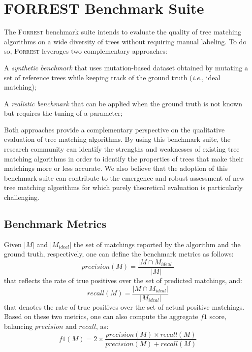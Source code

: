\documentclass{vldb}
\newcommand{\forrest}[0]{\textsc{Forrest}\xspace}
\begin{document}

\section{FORREST Benchmark Suite}\label{sec:forrest}
The \forrest benchmark suite intends to evaluate the quality of tree matching algorithms on a wide diversity of trees without requiring manual labeling.
To do so, \forrest leverages two complementary approaches:
\begin{compactenum}
    \item A \emph{synthetic benchmark} that uses mutation-based dataset obtained by mutating a set of reference trees while keeping track of the ground truth (\emph{i.e.}, ideal matching);
    \item A \emph{realistic benchmark} that can be applied when the ground truth is not known but requires the tuning of a parameter;
\end{compactenum}

Both approaches provide a complementary perspective on the qualitative evaluation of tree matching algorithms.
By using this benchmark suite, the research community can identify the strengths and weaknesses of existing tree matching algorithms in order to identify the properties of trees that make their matchings more or less accurate.
We also believe that the adoption of this benchmark suite can contribute to the emergence and robust assessment of new tree matching algorithms for which purely theoretical evaluation is particularly challenging.

\subsection{Benchmark Metrics}
Given $|M|$ and $|M_{ideal}|$ the set of matchings reported by the algorithm and the ground truth, respectively, one can define the benchmark metrics as follows:
\begin{equation}
    precision(M) = \frac{|M \cap M_{ideal}|}{|M|}
\end{equation}
that reflects the rate of true positives over the set of predicted matchings, and:
\begin{equation}
    recall(M) = \frac{|M \cap M_{ideal}|}{|M_{ideal}|}
\end{equation}
that denotes the rate of true positives over the set of actual positive matchings.
Based on these two metrics, one can also compute the aggregate $f1$ score, balancing $precision$ and $recall$, as:
\begin{equation}
    f1(M) =  2 \times \frac{precision(M) \times recall(M)}{precision(M) + recall(M)} 
\end{equation}
\end{document}
